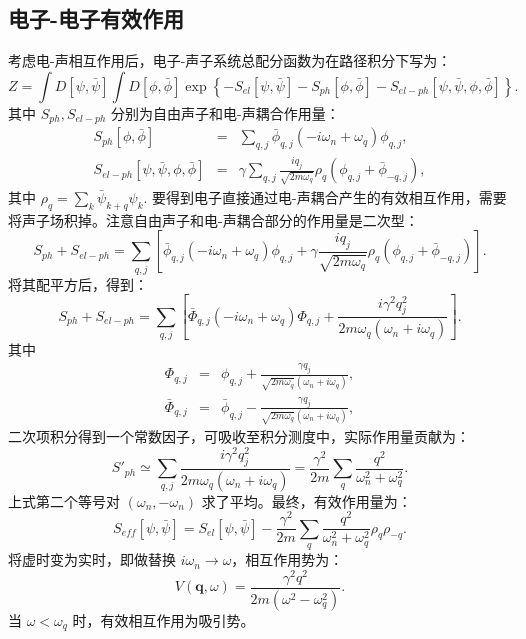 \documentclass[10pt,UTF8]{ctexart}
\begin{document}
\subsection*{电子-电子有效作用}
\noindent 考虑电-声相互作用后，电子-声子系统总配分函数为在路径积分下写为：
\begin{equation}
	Z = \int D[\psi, \bar\psi ] 
		\int D[\phi, \bar\phi ] 
		\exp\left\{
			-S_{el}[\psi,\bar\psi ]
			-S_{ph}[\phi,\bar\phi ]
			-S_{el-ph}[\psi,\bar\psi,\phi,\bar\phi ] 
			\right\}.
\end{equation}
其中 $S_{ph},S_{el-ph}$ 分别为自由声子和电-声耦合作用量：
\begin{eqnarray}
	S_{ph}[\phi,\bar\phi] 
	&=& \sum_{q,j} \bar\phi_{q,j}(-i\omega_n+\omega_q)\phi_{q,j}, \nonumber \\
	S_{el-ph}[\psi,\bar\psi,\phi,\bar\phi] 
	&=& \gamma \sum_{q,j} \frac{iq_j}{\sqrt{2m\omega_q}} \rho_q (\phi_{q,j}+\bar\phi_{-q,j}),
\end{eqnarray}
其中 $\rho_q=\sum_k \bar\psi_{k+q}\psi_k$. 要得到电子直接通过电-声耦合产生的有效相互作用，需要将声子场积掉。注意自由声子和电-声耦合部分的作用量是二次型：
\begin{equation}
	S_{ph}+S_{el-ph} 
	= \sum_{q,j} \left[ \bar\phi_{q,j}(-i\omega_n+\omega_q)\phi_{q,j} + \gamma \frac{iq_j}{\sqrt{2m\omega_q}} \rho_q (\phi_{q,j}+\bar\phi_{-q,j}) \right].
\end{equation}
将其配平方后，得到：
\begin{equation}
	S_{ph}+S_{el-ph} 
	= \sum_{q,j} \left[ \bar\Phi_{q,j} (-i\omega_n+\omega_q) \Phi_{q,j}
	+ \frac{i\gamma^2 q_j^2}{2m\omega_q(\omega_n+i\omega_q)} \right].
\end{equation}
其中
\begin{eqnarray}
	\Phi_{q,j} &=& \phi_{q,j} + \frac{\gamma q_j}{\sqrt{2m\omega_q}(\omega_n + i\omega_q)}, \nonumber \\
	\bar\Phi_{q,j} &=& \bar\phi_{q,j} - \frac{\gamma q_j}{\sqrt{2m\omega_q}(\omega_n + i\omega_q)},
\end{eqnarray}
二次项积分得到一个常数因子，可吸收至积分测度中，实际作用量贡献为：
\begin{equation}
	S'_{ph} 
	\simeq \sum_{q,j} \frac{i\gamma^2 q_j^2}{2m\omega_q(\omega_n+i\omega_q)}
	= \frac{\gamma^2}{2m} \sum_q \frac{q^2}{\omega_n^2+\omega_q^2}.
\end{equation}
上式第二个等号对 $(\omega_n, -\omega_{n})$ 求了平均。最终，有效作用量为：
\begin{equation}
	S_{eff}[\psi,\bar\psi] = S_{el}[\psi,\bar\psi]-\frac{\gamma^2}{2m} \sum_q \frac{q^2}{\omega_n^2+\omega_q^2}\rho_q\rho_{-q}.
\end{equation}
将虚时变为实时，即做替换 $i\omega_n\rightarrow \omega$，相互作用势为：
\begin{equation}
	V(\bm q,\omega)= \frac{\gamma^2 q^2}{2m(\omega^2-\omega_q^2)}.
\end{equation}
当 $\omega<\omega_q$ 时，有效相互作用为吸引势。
\end{document}
